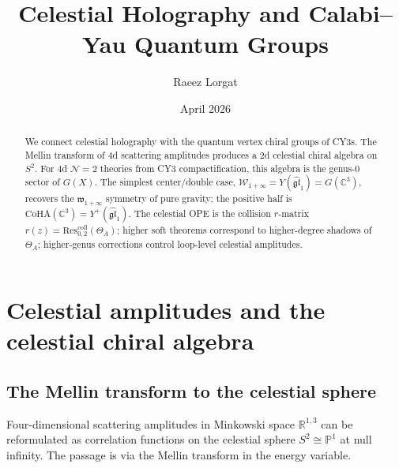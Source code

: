 \documentclass[11pt]{article}
\title{Celestial Holography and Calabi--Yau Quantum Groups}
\author{Raeez Lorgat}
\date{April 2026}
\theoremstyle{definition}
\theoremstyle{remark}
\newcommand{\cW}{\mathcal{W}}
\newcommand{\Res}{\mathrm{Res}}
\newcommand{\CoHA}{\mathrm{CoHA}}
\begin{document}
\maketitle

\begin{abstract}
We connect celestial holography with the quantum vertex chiral groups of CY3s. The Mellin transform of 4d scattering amplitudes produces a 2d celestial chiral algebra on $S^2$. For 4d $\mathcal{N}=2$ theories from CY3 compactification, this algebra is the genus-0 sector of $G(X)$. The simplest center/double case, $\cW_{1+\infty} = Y(\widehat{\mathfrak{gl}}_1) = G(\mathbb{C}^3)$, recovers the $\mathfrak{w}_{1+\infty}$ symmetry of pure gravity; the positive half is $\CoHA(\mathbb{C}^3)=Y^+(\widehat{\mathfrak{gl}}_1)$. The celestial OPE is the collision $r$-matrix $r(z) = \Res^{\mathrm{coll}}_{0,2}(\Theta_A)$; higher soft theorems correspond to higher-degree shadows of $\Theta_A$; higher-genus corrections control loop-level celestial amplitudes.
\end{abstract}

\tableofcontents

\section{Celestial amplitudes and the celestial chiral algebra}
\label{sec:celestial-amplitudes}

\subsection{The Mellin transform to the celestial sphere}

Four-dimensional scattering amplitudes in Minkowski space
$\mathbb{R}^{1,3}$ can be reformulated as correlation functions on
the celestial sphere $S^2 \cong \mathbb{P}^1$ at null infinity.
The passage is via the Mellin transform in the energy variable.
\end{document}
